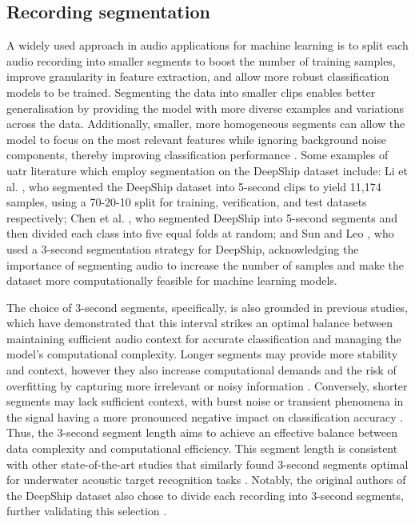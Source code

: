 \subsection{Recording segmentation}\label{subsec:segmentation}

A widely used approach in audio applications for machine learning is to split each audio recording into smaller segments to boost the number of training samples, improve granularity in feature extraction, and allow more robust classification models to be trained. Segmenting the data into smaller clips enables better generalisation by providing the model with more diverse examples and variations across the data. Additionally, smaller, more homogeneous segments can allow the model to focus on the most relevant features while ignoring background noise components, thereby improving classification performance \cite{xu_self-supervised_2023}. Some examples of \acrshort{uatr} literature which employ segmentation on the DeepShip dataset include: Li et al. \cite{li_underwater_2022}, who segmented the DeepShip dataset into 5-second clips to yield 11,174 samples, using a 70-20-10 split for training, verification, and test datasets respectively; Chen et al. \cite{chen_hierarchical_2024}, who segmented DeepShip into 5-second segments and then divided each class into five equal folds at random; and Sun and Leo \cite{sun_underwater_2023}, who used a 3-second segmentation strategy for DeepShip, acknowledging the importance of segmenting audio to increase the number of samples and make the dataset more computationally feasible for machine learning models. 

The choice of 3-second segments, specifically, is also grounded in previous studies, which have demonstrated that this interval strikes an optimal balance between maintaining sufficient audio context for accurate classification and managing the model's computational complexity. Longer segments may provide more stability and context, however they also increase computational demands and the risk of overfitting by capturing more irrelevant or noisy information \cite{chen_ship-radiated_2024, li_underwater_2022}. Conversely, shorter segments may lack sufficient context, with burst noise or transient phenomena in the signal having a more pronounced negative impact on classification accuracy \cite{shen_auditory_2018, tang_deep_2024}. Thus, the 3-second segment length aims to achieve an effective balance between data complexity and computational efficiency. This segment length is consistent with other state-of-the-art studies that similarly found 3-second segments optimal for underwater acoustic target recognition tasks \cite{xu_self-supervised_2024, tang_deep_2024}. Notably, the original authors of the DeepShip dataset also chose to divide each recording into 3-second segments, further validating this selection \cite{irfan_deepship_2021}.

